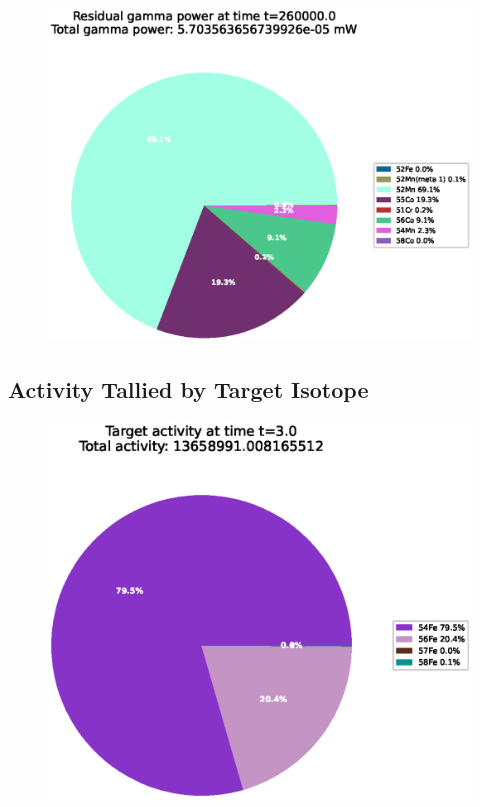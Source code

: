 \begin{figure}[!htb]
\centering
\includegraphics[width=0.8\linewidth]{chapters/activity_code/fe-activity-v2/residual-energy/0300_260000.eps}
\caption{}
\label{fig:activity-v2-residual-power-260000s}
\end{figure}



\clearpage

\subsection{Activity Tallied by Target Isotope}

\FloatBarrier


\begin{figure}[!htb]
\centering
\includegraphics[width=0.8\linewidth]{chapters/activity_code/fe-activity-v2/target-activity/0001_3.eps}
\caption{}
\label{fig:activity-v2-target-activity-3s}
\end{figure}

